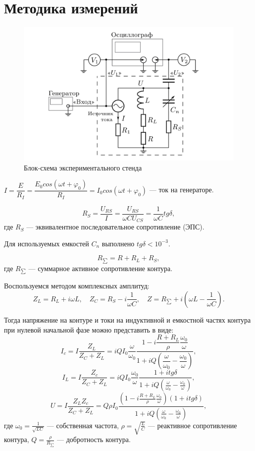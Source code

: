 \documentclass[a4paper, 12pt]{article}
\begin{document}
\section{Методика измерений}

\begin{figure}[h!]
\begin{center}
    \includegraphics[scale=2.5]{ust.png}
\end{center}
\caption{Блок-схема экспериментального стенда}
\label{ust}
\end{figure}

$I=\dfrac{E}{R_I}=\dfrac{E_0cos(\omega t+\varphi_0)}{R_I}=I_0cos(\omega t+\varphi_0)$ --- ток на генераторе.

\begin{equation}\label{eq:Rs}
R_S=\dfrac{U_{RS}}{I}=\frac{U_{RS}}{\omega CU_{CS}}=\dfrac{1}{\omega C}tg\delta,
\end{equation}
где $R_S$ --- эквивалентное последовательное сопротивление (ЭПС).

Для используемых емкостей $C_n$ выполнено $tg\delta<10^{-3}$.

\begin{equation}\label{eq:Rsum}
R_{\sum}=R+R_L+R_S,
\end{equation}
где $R_{\sum}$ --- суммарное активное сопротивление контура.

Воспользуемся методом комплексных амплитуд:
$$Z_L=R_L+i\omega L, \quad Z_C=R_S-i\frac{1}{\omega C}, \quad Z=R_{\sum}+i(\omega L-\dfrac{1}{\omega C}).$$

Тогда напряжение на контуре и токи на индуктивной и емкостной частях контура при нулевой начальной фазе можно представить в виде:
$$I_c=I\dfrac{Z_L}{Z_C+Z_L}=iQI_0\dfrac{\omega}{\omega_0}\dfrac{1-i\dfrac{R+R_L}{\rho}\dfrac{\omega_0}{\omega}}{1+iQ(\dfrac{\omega}{\omega_0}-\dfrac{\omega_0}{\omega})},$$
$$I_L=I\dfrac{Z_c}{Z_C+Z_L}=iQI_0\frac{\omega_0}{\omega}\frac{1+itg\delta}{1+iQ(\frac{\omega}{\omega_0}-\frac{\omega_0}{\omega})},$$
$$U=I\frac{Z_LZ_c}{Z_C+Z_L}=Q\rho I_0\frac{(1-i\frac{R+R_L}{\rho}\frac{\omega_0}{\omega})(1+itg\delta)}{1+iQ(\frac{\omega}{\omega_0}-\frac{\omega_0}{\omega})},$$
где $\omega_0=\frac{1}{\sqrt{LC}}$ --- собственная частота, $\rho=\sqrt{\frac{L}{C}}$ --- реактивное сопротивление контура, $Q=\frac{\rho}{R_{\sum}}$ --- добротность контура.
\end{document}

